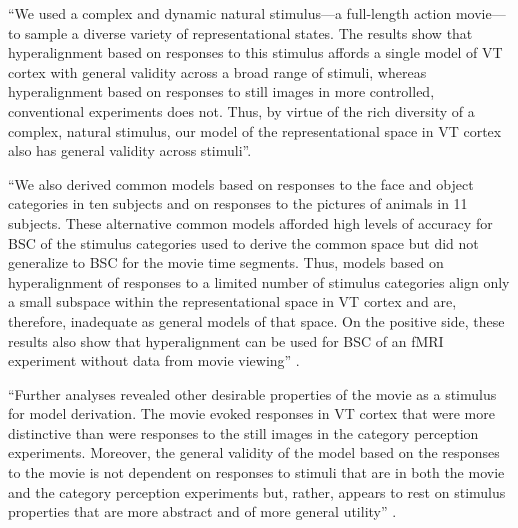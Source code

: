 ``We used a complex and dynamic natural stimulus---a full-length action
movie---to sample a diverse variety of representational states.
%
The results show that hyperalignment based on responses to this stimulus affords
a single model of VT cortex with general validity across a broad range of
stimuli, whereas hyperalignment based on responses to still images in more
controlled, conventional experiments does not.
%
Thus, by virtue of the rich diversity of a complex, natural stimulus, our model
of the representational space in VT cortex also has general validity across
stimuli''\citep{haxby2011common}.

``We also derived common models based on responses to the face and object
categories in ten subjects and on responses to the pictures of animals in 11
subjects.
%
These alternative common models afforded high levels of accuracy for BSC of the
stimulus categories used to derive the common space but did not generalize to
BSC for the movie time segments.
%
Thus, models based on hyperalignment of responses to a limited number of
stimulus categories align only a small subspace within the representational
space in VT cortex and are, therefore, inadequate as general models of that
space.
%
On the positive side, these results also show that hyperalignment can be used
for BSC of an fMRI experiment without data from movie viewing''
\citep{haxby2011common}.

%
``Further analyses revealed other desirable properties of the movie as a
stimulus for model derivation.
%
The movie evoked responses in VT cortex that were more distinctive than were
responses to the still images in the category perception experiments.
%
Moreover, the general validity of the model based on the responses to the movie
is not dependent on responses to stimuli that are in both the movie and the
category perception experiments but, rather, appears to rest on stimulus
properties that are more abstract and of more general utility''
\citep{haxby2011common}.

